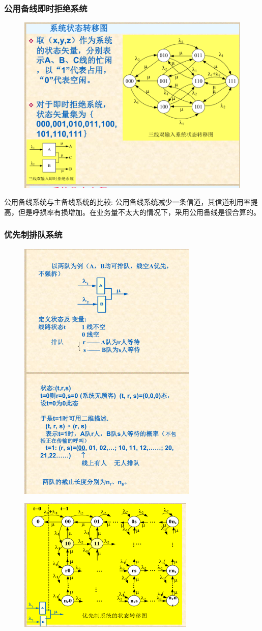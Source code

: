 \documentclass{article}
\begin{document}
	\subsubsection{公用备线即时拒绝系统}
	\begin{figure}[H]
		\centering
		\includegraphics[width=0.5\linewidth]{figures/prove_9}
		\caption{}
		\label{fig:prove9}
	\end{figure}
	公用备线系统与主备线系统的比较:
	公用备线系统减少一条信道，其信道利用率提高，但是呼损率有损增加。在业务量不太大的情况下，采用公用备线是很合算的。
	\subsubsection{优先制排队系统}
	\begin{figure}[H]
		\centering
		\includegraphics[width=0.5\linewidth]{figures/prove_10}
		\caption{}
		\label{fig:prove10}
	\end{figure}
	\begin{figure}[H]
		\centering
		\includegraphics[width=0.5\linewidth]{figures/prove_11}
		\caption{}
		\label{fig:prove11}
	\end{figure}
	
\end{document}
